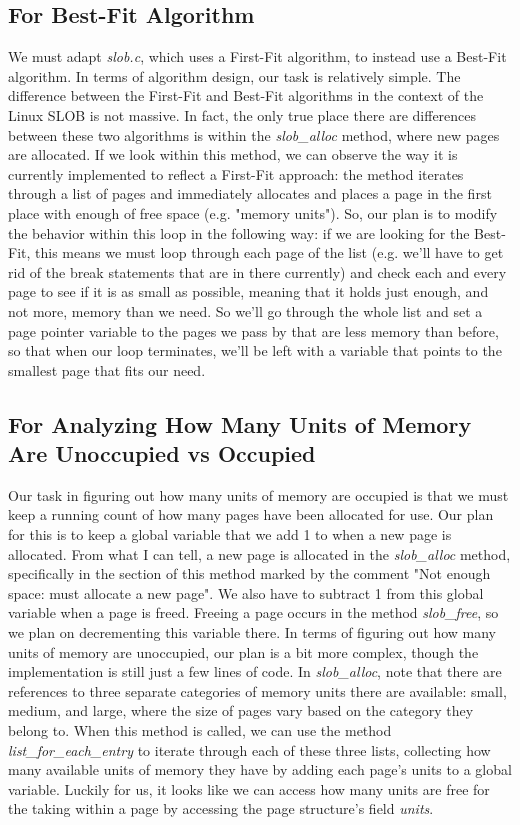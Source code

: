 \documentclass[letterpaper,10pt,titlepage]{article}
\begin{document}
\subsection{For Best-Fit Algorithm}
We must adapt \emph{slob.c}, which uses a First-Fit algorithm, to instead use a Best-Fit algorithm. In terms of algorithm design, our task is relatively simple. The difference between the First-Fit and Best-Fit algorithms in the context of the Linux SLOB is not massive. In fact, the only true place there are differences between these two algorithms is within the \emph{slob\_alloc} method, where new pages are allocated. If we look within this method, we can observe the way it is currently implemented to reflect a First-Fit approach: the method iterates through a list of pages and immediately allocates and places a page in the first place with enough of free space (e.g. "memory units"). So, our plan is to modify the behavior within this loop in the following way: if we are looking for the Best-Fit, this means we must loop through each page of the list (e.g. we'll have to get rid of the break statements that are in there currently) and check each and every page to see if it is as small as possible, meaning that it holds just enough, and not more, memory than we need. So we'll go through the whole list and set a page pointer variable to the pages we pass by that are less memory than before, so that when our loop terminates, we'll be left with a variable that points to the smallest page that fits our need. 
\subsection{For Analyzing How Many Units of Memory Are Unoccupied vs Occupied}
Our task in figuring out how many units of memory are occupied is that we must keep a running count of how many pages have been allocated for use. Our plan for this is to keep a global variable that we add 1 to when a new page is allocated. From what I can tell, a new page is allocated in the \emph{slob\_alloc} method, specifically in the section of this method marked by the comment "Not enough space: must allocate a new page". We also have to subtract 1 from this global variable when a page is freed. Freeing a page occurs in the method \emph{slob\_free}, so we plan on decrementing this variable there.
In terms of figuring out how many units of memory are unoccupied, our plan is a bit more complex, though the implementation is still just a few lines of code. In \emph{slob\_alloc}, note that there are references to three separate categories of memory units there are available: small, medium, and large, where the size of pages vary based on the category they belong to. When this method is called, we can use the method \emph{list\_for\_each\_entry} to iterate through each of these three lists, collecting how many available units of memory they have by adding each page's units to a global variable. Luckily for us, it looks like we can access how many units are free for the taking within a page by accessing the page structure's field \emph{units}.  
\end{document}
